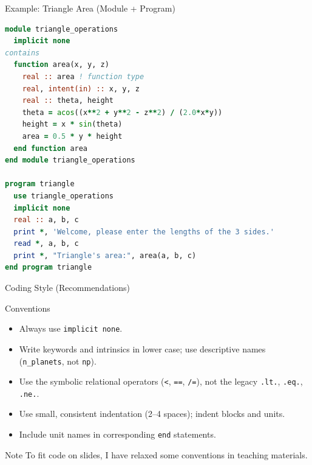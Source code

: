 

\subtitle{Lecture 2: Fortran Types, Expressions, and Control Flow}



\begin{frame}
  \titlepage
\end{frame}

\begin{frame}[fragile]{Example: Triangle Area (Module + Program)}
\begin{lstlisting}[language=Fortran]
module triangle_operations
  implicit none
contains
  function area(x, y, z)
    real :: area ! function type
    real, intent(in) :: x, y, z
    real :: theta, height
    theta = acos((x**2 + y**2 - z**2) / (2.0*x*y))
    height = x * sin(theta)
    area = 0.5 * y * height
  end function area
end module triangle_operations

program triangle
  use triangle_operations
  implicit none
  real :: a, b, c
  print *, 'Welcome, please enter the lengths of the 3 sides.'
  read *, a, b, c
  print *, "Triangle's area:", area(a, b, c)
end program triangle
\end{lstlisting}
\end{frame}


\begin{frame}{Coding Style (Recommendations)}
\begin{block}{Conventions}
\begin{itemize}
\item Always use \texttt{implicit none}.
\item Write keywords and intrinsics in lower case; use descriptive names (\texttt{n\_planets}, not \texttt{np}).
\item Use the symbolic relational operators (\texttt{<}, \texttt{==}, \texttt{/=}), not the legacy \texttt{.lt.}, \texttt{.eq.}, \texttt{.ne.}.
\item Use small, consistent indentation (2–4 spaces); indent blocks and units.
\item Include unit names in corresponding \texttt{end} statements.
\end{itemize}
\end{block}
\begin{block}{Note}
To fit code on slides, I have relaxed some conventions in teaching materials.
\end{block}
\end{frame}


